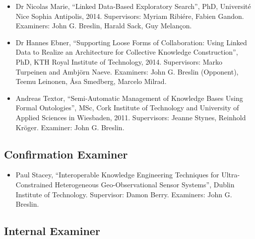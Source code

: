 \documentclass[10pt,a4paper]{res} %
\begin{document}
\begin{resume}
\begin{itemize}
\item Dr Nicolas Marie, ``Linked Data-Based Exploratory Search'', PhD, Universit\'{e} Nice Sophia Antipolis, 2014. Supervisors: Myriam Ribi\'{e}re, Fabien Gandon. Examiners: John G. Breslin, Harald Sack, Guy Melan\c{c}on.
\item Dr Hannes Ebner, ``Supporting Loose Forms of Collaboration: Using Linked Data to Realize an Architecture for Collective Knowledge Construction'', PhD, KTH Royal Institute of Technology, 2014. Supervisors: Marko Turpeinen and Ambj{\"o}rn Naeve. Examiners: John G. Breslin (Opponent), Teemu Leinonen, \r{A}sa Smedberg, Marcelo Milrad.
\item Andreas Textor, ``Semi-Automatic Management of Knowledge Bases Using Formal Ontologies'', MSc, Cork Institute of Technology and University of Applied Sciences in Wiesbaden, 2011. Supervisors: Jeanne Stynes, Reinhold Kr{\"o}ger. Examiner: John G. Breslin.
\end{itemize}

\subsection*{Confirmation Examiner}

\begin{itemize} \itemsep -2pt
\item Paul Stacey, ``Interoperable Knowledge Engineering Techniques for Ultra-Constrained Heterogeneous Geo-Observational Sensor Systems'', Dublin Institute of Technology. Supervisor: Damon Berry. Examiners: John G. Breslin.
\end{itemize}

\subsection*{Internal Examiner}


\end{resume}
\end{document}
